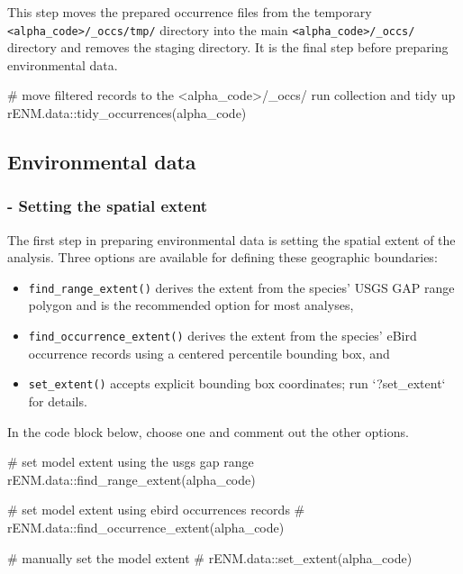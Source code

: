 \documentclass[
  letterpaper,
  DIV=11,
  numbers=noendperiod]{scrartcl}
\newenvironment{Shaded}{\begin{snugshade}}{\end{snugshade}}
\newcommand{\CommentTok}[1]{\textcolor[rgb]{0.37,0.37,0.37}{#1}}
\newcommand{\FunctionTok}[1]{\textcolor[rgb]{0.28,0.35,0.67}{#1}}
\newcommand{\NormalTok}[1]{\textcolor[rgb]{0.00,0.23,0.31}{#1}}
\newcommand{\SpecialCharTok}[1]{\textcolor[rgb]{0.37,0.37,0.37}{#1}}
\begin{document}
This step moves the prepared occurrence files from the temporary
\texttt{\textless{}alpha\_code\textgreater{}/\_occs/tmp/} directory into
the main \texttt{\textless{}alpha\_code\textgreater{}/\_occs/} directory
and removes the staging directory. It is the final step before preparing
environmental data.

\begin{Shaded}
\begin{Highlighting}[]
\CommentTok{\# move filtered records to the \textless{}alpha\_code\textgreater{}/\_occs/ run collection and tidy up}
\NormalTok{rENM.data}\SpecialCharTok{::}\FunctionTok{tidy\_occurrences}\NormalTok{(alpha\_code)}
\end{Highlighting}
\end{Shaded}

\subsection{Environmental data}\label{environmental-data}

\subsubsection{- Setting the spatial
extent}\label{setting-the-spatial-extent}

The first step in preparing environmental data is setting the spatial
extent of the analysis. Three options are available for defining these
geographic boundaries:

\begin{itemize}
\item
  \texttt{find\_range\_extent()} derives the extent from the species'
  USGS GAP range polygon and is the recommended option for most
  analyses,
\item
  \texttt{find\_occurrence\_extent()} derives the extent from the
  species' eBird occurrence records using a centered percentile bounding
  box, and
\item
  \texttt{set\_extent()} accepts explicit bounding box coordinates; run
  `?set\_extent` for details.
\end{itemize}

In the code block below, choose one and comment out the other options.

\begin{Shaded}
\begin{Highlighting}[]
\CommentTok{\# set model extent using the usgs gap range}
\NormalTok{rENM.data}\SpecialCharTok{::}\FunctionTok{find\_range\_extent}\NormalTok{(alpha\_code)}

\CommentTok{\# set model extent using ebird occurrences records}
\CommentTok{\# rENM.data::find\_occurrence\_extent(alpha\_code)}

\CommentTok{\# manually set the model extent}
\CommentTok{\# rENM.data::set\_extent(alpha\_code)}
\end{Highlighting}
\end{Shaded}
\end{document}

